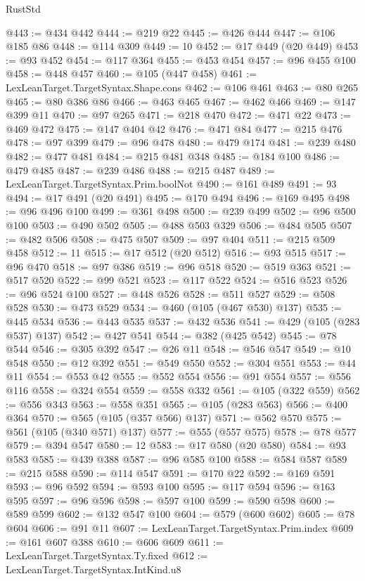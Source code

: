 \begin{lexlean}{RustStd}
\begin{coremodule}
@443 := @434 @442
@444 := @219 @22
@445 := @426 @444
@447 := @106 @185 @86
@448 := @114 @309
@449 := 10
@452 := @17 @449 (@20 @449)
@453 := @93 @452
@454 := @117 @364
@455 := @453 @454
@457 := @96 @455 @100
@458 := @448 @457
@460 := @105 (@447 @458)
@461 := LexLeanTarget.TargetSyntax.Shape.cons
@462 := @106 @461
@463 := @80 @265
@465 := @80 @386 @86
@466 := @463 @465
@467 := @462 @466
@469 := @147 @399 @11
@470 := @97 @265
@471 := @218 @470
@472 := @471 @22
@473 := @469 @472
@475 := @147 @404 @42
@476 := @471 @84
@477 := @215 @476
@478 := @97 @399
@479 := @96 @478
@480 := @479 @174
@481 := @239 @480
@482 := @477 @481
@484 := @215 @481 @348
@485 := @184 @100
@486 := @479 @485
@487 := @239 @486
@488 := @215 @487
@489 := LexLeanTarget.TargetSyntax.Prim.boolNot
@490 := @161 @489
@491 := 93
@494 := @17 @491 (@20 @491)
@495 := @170 @494
@496 := @169 @495
@498 := @96 @496 @100
@499 := @361 @498
@500 := @239 @499
@502 := @96 @500 @100
@503 := @490 @502
@505 := @488 @503 @329
@506 := @484 @505
@507 := @482 @506
@508 := @475 @507
@509 := @97 @404
@511 := @215 @509 @458
@512 := 11
@515 := @17 @512 (@20 @512)
@516 := @93 @515
@517 := @96 @470
@518 := @97 @386
@519 := @96 @518
@520 := @519 @363
@521 := @517 @520
@522 := @99 @521
@523 := @117 @522
@524 := @516 @523
@526 := @96 @524 @100
@527 := @448 @526
@528 := @511 @527
@529 := @508 @528
@530 := @473 @529
@534 := @460 (@105 (@467 @530) @137)
@535 := @445 @534
@536 := @443 @535
@537 := @432 @536
@541 := @429 (@105 (@283 @537) @137)
@542 := @427 @541
@544 := @382 (@425 @542)
@545 := @78 @544
@546 := @305 @392
@547 := @26 @11
@548 := @546 @547
@549 := @10 @548
@550 := @12 @392
@551 := @549 @550
@552 := @304 @551
@553 := @44 @11
@554 := @553 @42
@555 := @552 @554
@556 := @91 @554
@557 := @556 @116
@558 := @324 @554
@559 := @558 @332
@561 := @105 (@322 @559)
@562 := @556 @343
@563 := @558 @351
@565 := @105 (@283 @563)
@566 := @400 @364
@570 := @565 (@105 (@357 @566) @137)
@571 := @562 @570
@575 := @561 (@105 (@340 @571) @137)
@577 := @555 (@557 @575)
@578 := @78 @577
@579 := @394 @547
@580 := 12
@583 := @17 @580 (@20 @580)
@584 := @93 @583
@585 := @439 @388
@587 := @96 @585 @100
@588 := @584 @587
@589 := @215 @588
@590 := @114 @547
@591 := @170 @22
@592 := @169 @591
@593 := @96 @592
@594 := @593 @100
@595 := @117 @594
@596 := @163 @595
@597 := @96 @596
@598 := @597 @100
@599 := @590 @598
@600 := @589 @599
@602 := @132 @547 @100
@604 := @579 (@600 @602)
@605 := @78 @604
@606 := @91 @11
@607 := LexLeanTarget.TargetSyntax.Prim.index
@609 := @161 @607 @388
@610 := @606 @609
@611 := LexLeanTarget.TargetSyntax.Ty.fixed
@612 := LexLeanTarget.TargetSyntax.IntKind.u8

\end{coremodule}
\end{lexlean}
